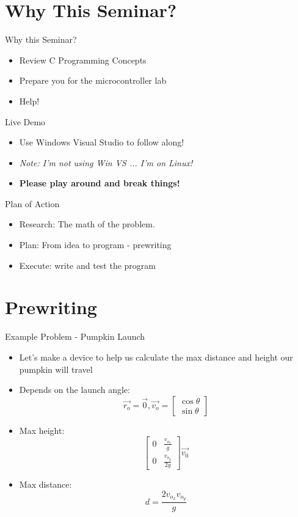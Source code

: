 \documentclass[main.tex]{subfile}
\begin{document}
\section{Why This Seminar?} 
\label{sec:why_this_seminar_}
\begin{frame}{Why this Seminar?}
	\begin{itemize}
		\item Review C Programming Concepts
		\item Prepare you for the microcontroller lab
		\item Help!
	\end{itemize}
\end{frame}

\begin{frame}{Live Demo}
	\begin{itemize}
		\item Use Windows Visual Studio to follow along!
		\item \emph{Note: I'm not using Win VS ... I'm on Linux!}
		\item \textbf{Please play around and break things!}
	\end{itemize}
\end{frame}

\begin{frame}{Plan of Action}
	\begin{itemize}
		\item Research: The math of the problem.
		\item Plan: From idea to program - prewriting
		\item Execute: write and test the program
	\end{itemize}
\end{frame}

\section{Prewriting} 
\label{sec:prewriting}

\begin{frame}[fragile]{Example Problem - Pumpkin Launch}
	\begin{itemize}
		\item Let's make a device to help us calculate the max distance and height
				our pumpkin will travel
		\item Depends on the launch angle: 
			\[ 
				\vec{r_o} = \vec{0} , 
				\vec{v_{o}} = 
					\begin{bmatrix} \cos{\theta} \\ \sin{\theta} \end{bmatrix} 
			\]
		\item Max height: 
			\[
				\begin{bmatrix}
					   0 & \frac{v_{o_{x}}}{g}
					\\ 0 & \frac{v_{o_{y}}}{2 g}
				\end{bmatrix}\vec{v_0}
			\]
		\item Max distance: \[d = \frac{2 v_{o_{x}} v_{o_{y}}}{g}\]
	\end{itemize}
	
\end{frame}
\end{document}
